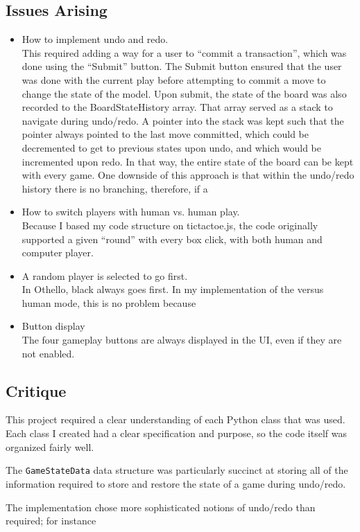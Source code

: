 \documentclass[11pt,letterpaper]{article}
\begin{document}
\subsection{Issues Arising}
\begin{itemize}
\item How to implement undo and redo.\\
This required adding a way for a user to ``commit a transaction'', which was done using the ``Submit'' button. The Submit button ensured that the user was done with the current play before attempting to commit a move to change the state of the model. Upon submit, the state of the board was also recorded to the BoardStateHistory array. That array served as a stack to navigate during undo/redo. A pointer into the stack was kept such that the pointer always pointed to the last move committed, which could be decremented to get to previous states upon undo, and which would be incremented upon redo. In that way, the entire state of the board can be kept with every game. One downside of this approach is that within the undo/redo history there is no branching, therefore, if a 
\item How to switch players with human vs. human play.\\
Because I based my code structure on tictactoe.js, the code originally supported a given ``round'' with every box click, with both human and computer player.
\item A random player is selected to go first.\\
In Othello, black always goes first. In my implementation of the versus human mode, this is no problem because
\item Button display\\
The four gameplay buttons are always displayed in the UI, even if they are not enabled.
\end{itemize}

\subsection{Critique}
This project required a clear understanding of each Python class that was used. Each class I created had a clear specification and purpose, so the code itself was organized fairly well.

The \texttt{GameStateData} data structure was particularly succinct at storing all of the information required to store and restore the state of a game during undo/redo.

The implementation chose more sophisticated notions of undo/redo than required; for instance
\end{document}
